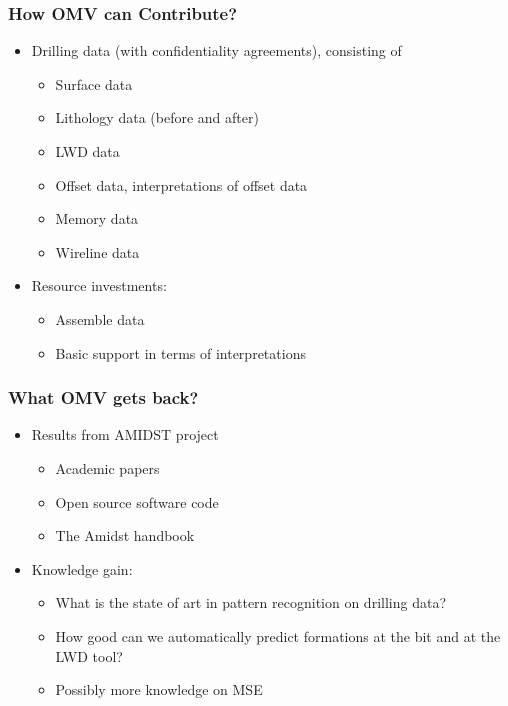 \documentclass{beamer}
\begin{document}
\begin{frame} \frametitle{How OMV can Contribute?} 
\vspace{-1cm}

\begin{itemize}
\item<1-> Drilling data (with confidentiality agreements), consisting of
\begin{itemize}
\item<1-> Surface data
\item<1-> Lithology data (before and after)
\item<1-> LWD data
\item<1-> Offset data, interpretations of offset data
\item<2-> Memory data
\item<2-> Wireline data 
\end{itemize}
\item<3-> Resource investments:
\begin{itemize}
\item<3->  Assemble data
\item<3-> Basic support in terms of interpretations
\end{itemize}
\end{itemize}

\end{frame}

\begin{frame} \frametitle{What OMV gets back?} 
\vspace{-1cm}

\begin{itemize}
\item<1-> Results from AMIDST project
\begin{itemize}
\item<1-> Academic papers 
\item<1-> Open source software code
\item<1-> The Amidst handbook
\end{itemize}
\item<2-> Knowledge gain:
\begin{itemize}
\item<2-> What is the state of art in pattern recognition on drilling data?
\item<2-> How good can we automatically predict formations at the bit and at the LWD tool?
\item<2-> Possibly more knowledge on MSE
\end{itemize}
\end{itemize}

\end{frame}
\end{document}
